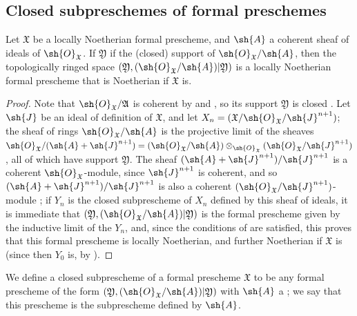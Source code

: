 \subsection{Closed subpreschemes of formal preschemes}
\label{subsection:I.10.14}

\begin{proposition}[10.14.1]
\label{I.10.14.1}
Let $\mathfrak{X}$ be a locally Noetherian formal prescheme, and $\sh{A}$ a coherent sheaf of ideals of $\sh{O}_\mathfrak{X}$.
If $\mathfrak{Y}$ if the (closed) support of $\sh{O}_\mathfrak{X}/\sh{A}$, then the topologically ringed space $(\mathfrak{Y},(\sh{O}_\mathfrak{X}/\sh{A})|\mathfrak{Y})$ is a locally Noetherian formal prescheme that is Noetherian if $\mathfrak{X}$ is.
\end{proposition}

\begin{proof}
Note that $\sh{O}_\mathfrak{X}/\mathfrak{A}$ is coherent by  and , so its support $\mathfrak{Y}$ is closed .
Let $\sh{J}$ be an ideal of definition of $\mathfrak{X}$, and let $X_n=(\mathfrak{X}/\sh{O}_\mathfrak{X}/\sh{J}^{n+1})$;
the sheaf of rings $\sh{O}_\mathfrak{X}/\sh{A}$ is the projective limit of the sheaves $\sh{O}_\mathfrak{X}/(\sh{A}+\sh{J}^{n+1})=(\sh{O}_\mathfrak{X}/\sh{A})\otimes_{\sh{O}_\mathfrak{X}}(\sh{O}_\mathfrak{X}/\sh{J}^{n+1})$ , all of which have support $\mathfrak{Y}$.
The sheaf $(\sh{A}+\sh{J}^{n+1})/\sh{J}^{n+1}$ is a coherent $\sh{O}_\mathfrak{X}$-module, since $\sh{J}^{n+1}$ is coherent, and so $(\sh{A}+\sh{J}^{n+1})/\sh{J}^{n+1}$ is also a coherent $(\sh{O}_\mathfrak{X}/\sh{J}^{n+1})$-module ;
if $Y_n$ is the closed subprescheme of $X_n$ defined by this sheaf of ideals, it is immediate that $(\mathfrak{Y},(\sh{O}_\mathfrak{X}/\sh{A})|\mathfrak{Y})$
is the formal prescheme given by the inductive limit of the $Y_n$, and, since the conditions of  are satisfied, this proves that this formal prescheme is locally Noetherian, and further Noetherian if $\mathfrak{X}$ is (since then $Y_0$ is, by ).
\end{proof}

\begin{definition}[10.14.2]
\label{I.10.14.2}
We define a closed subprescheme of a formal prescheme $\mathfrak{X}$ to be any formal prescheme of the form $(\mathfrak{Y},(\sh{O}_\mathfrak{X}/\sh{A})|\mathfrak{Y})$ with $\sh{A}$ a ;
we say that this prescheme is the subprescheme defined by $\sh{A}$.
\end{definition}

